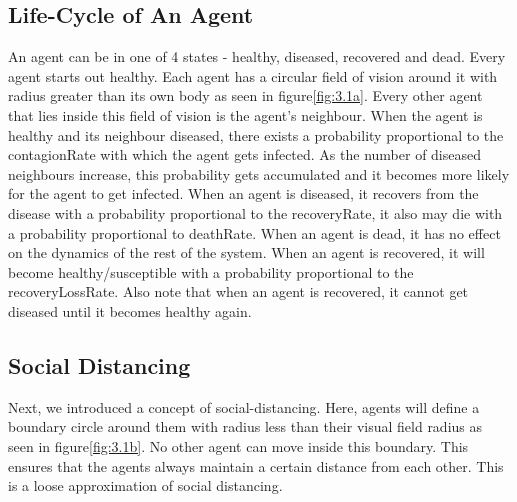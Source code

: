 \documentclass[a4paper,11pt]{article}
\begin{document}
    \subsection{Life-Cycle of An Agent}\label{subsec:life-cycle-of-an-agent}
    An agent can be in one of 4 states - healthy, diseased, recovered and dead.
    Every agent starts out healthy.
    Each agent has a circular field of vision around it with radius greater than its own body as seen in figure\ref{fig:3.1a}.
    Every other agent that lies inside this field of vision is the agent's neighbour.
    When the agent is healthy and its neighbour diseased, there exists a probability proportional to the contagionRate with which the agent gets infected.
    As the number of diseased neighbours increase, this probability gets accumulated and it becomes more likely for the agent to get infected.
    When an agent is diseased, it recovers from the disease with a probability proportional to the recoveryRate, it also may die with a probability proportional to deathRate.
    When an agent is dead, it has no effect on the dynamics of the rest of the system.
    When an agent is recovered, it will become healthy/susceptible with a probability proportional to the recoveryLossRate.
    Also note that when an agent is recovered, it cannot get diseased until it becomes healthy again.

    \subsection{Social Distancing}\label{subsec:social-distancing}
    Next, we introduced a concept of social-distancing\cite{3b1b}.
    Here, agents will define a boundary circle around them with radius less than their visual field radius as seen in figure\ref{fig:3.1b}.
    No other agent can move inside this boundary.
    This ensures that the agents always maintain a certain distance from each other.
    This is a loose approximation of social distancing.
\end{document}
